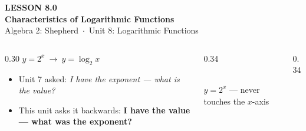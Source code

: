 \documentclass[aspectratio=169, 11pt]{beamer}
\newcommand{\lgrid}[4]{%
  \draw[step=1, linegray!45, thin] (#1,#3) grid (#2,#4);
  \draw[->, thick, charcoal] (#1,0)--(#2,0) node[below right, font=\tiny]{$x$};
  \draw[->, thick, charcoal] (0,#3)--(0,#4) node[left, font=\tiny]{$y$};}
\begin{document}
{
\begin{frame}[plain]
  \vspace{2.8cm}\hspace{0.55cm}%
  \begin{minipage}{0.9\textwidth}
    {\color{goldacc}\bfseries\small LESSON 8.0}\\[0.5cm]
    {\color{white}\bfseries\LARGE Characteristics of Logarithmic Functions}\\[1.2cm]
    {\color{forestmid}\small Algebra 2: Shepherd~$\cdot$~Unit 8: Logarithmic Functions}
  \end{minipage}
\end{frame}
}

\begin{frame}[t, plain]
  \begin{columns}[T]
    \begin{column}{0.30\textwidth}
      \centering $y = 2^x \ \longrightarrow\ y=\log_2 x$
      \begin{itemize}\setlength{\itemsep}{4pt}
        \item Unit 7 asked: \emph{I have the exponent --- what is the value?}
        \item This unit asks it backwards: \textbf{I have the value --- what was the exponent?}
      \end{itemize}
    \end{column}
    \begin{column}{0.34\textwidth}
      \centering
      \\[2pt]
      {\footnotesize $y=2^x$ --- never touches the $x$-axis}
    \end{column}
    \begin{column}{0.34\textwidth}
      \centering
\end{column}
\end{columns}
\end{frame}
\end{document}
